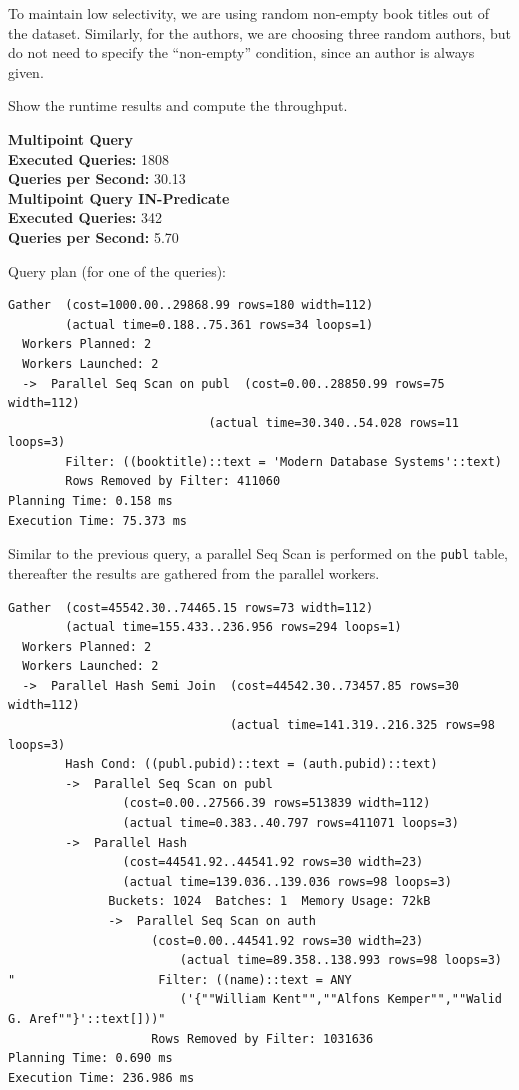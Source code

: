 \documentclass[11pt]{scrartcl}
\begin{document}
To maintain low selectivity, we are using random non-empty book titles out of the dataset.
Similarly, for the authors, we are choosing three random authors, but do not need to specify the \enquote{non-empty}
condition, since an author is always given.

Show the runtime results and compute the throughput.

\textbf{Multipoint Query}\\
\textbf{Executed Queries: } 1808\\
\textbf{Queries per Second: } 30.13 \\

\textbf{Multipoint Query IN-Predicate}\\
\textbf{Executed Queries: } 342\\
\textbf{Queries per Second: } 5.70

Query plan (for one of the queries):

{\small
\parskip0pt\begin{verbatim}
Gather  (cost=1000.00..29868.99 rows=180 width=112)
        (actual time=0.188..75.361 rows=34 loops=1)
  Workers Planned: 2
  Workers Launched: 2
  ->  Parallel Seq Scan on publ  (cost=0.00..28850.99 rows=75 width=112)
                            (actual time=30.340..54.028 rows=11 loops=3)
        Filter: ((booktitle)::text = 'Modern Database Systems'::text)
        Rows Removed by Filter: 411060
Planning Time: 0.158 ms
Execution Time: 75.373 ms
\end{verbatim}}

Similar to the previous query, a parallel Seq Scan is performed on the \texttt{publ} table, thereafter the results are
gathered from the parallel workers.


{\small
\parskip0pt\begin{verbatim}
Gather  (cost=45542.30..74465.15 rows=73 width=112)
        (actual time=155.433..236.956 rows=294 loops=1)
  Workers Planned: 2
  Workers Launched: 2
  ->  Parallel Hash Semi Join  (cost=44542.30..73457.85 rows=30 width=112)
                               (actual time=141.319..216.325 rows=98 loops=3)
        Hash Cond: ((publ.pubid)::text = (auth.pubid)::text)
        ->  Parallel Seq Scan on publ
                (cost=0.00..27566.39 rows=513839 width=112)
                (actual time=0.383..40.797 rows=411071 loops=3)
        ->  Parallel Hash
                (cost=44541.92..44541.92 rows=30 width=23)
                (actual time=139.036..139.036 rows=98 loops=3)
              Buckets: 1024  Batches: 1  Memory Usage: 72kB
              ->  Parallel Seq Scan on auth
                    (cost=0.00..44541.92 rows=30 width=23)
                        (actual time=89.358..138.993 rows=98 loops=3)
"                    Filter: ((name)::text = ANY
                        ('{""William Kent"",""Alfons Kemper"",""Walid G. Aref""}'::text[]))"
                    Rows Removed by Filter: 1031636
Planning Time: 0.690 ms
Execution Time: 236.986 ms
\end{verbatim}}
\end{document}
